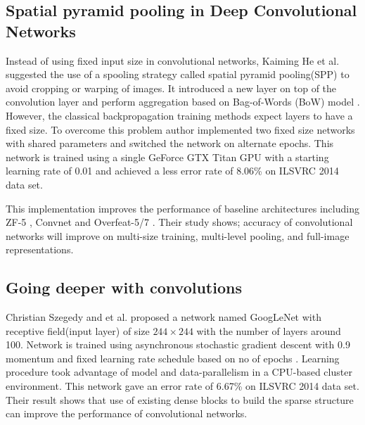 \documentclass{article}
\begin{document}

\subsection{Spatial pyramid pooling in Deep Convolutional Networks}
Instead of using fixed input size in convolutional networks, Kaiming He et al. \cite{He2014} suggested  the use of a spooling strategy called  spatial pyramid pooling(SPP)\cite{Grauman2005}\cite{1641019} to avoid cropping or warping of  images. It introduced a new layer on top of the convolution layer and perform aggregation  based on Bag-of-Words (BoW) model \cite{Sivic2003}. However, the classical backpropagation training methods expect layers to have a fixed   size. To overcome this problem author implemented two fixed size networks with shared parameters and switched the network on alternate epochs. This network is trained using a single GeForce GTX Titan GPU with a starting  learning rate of 0.01 and achieved  a less  error rate of 8.06\% on  ILSVRC 2014 data set. 
\par 
This implementation improves the performance of baseline architectures including ZF-5\cite{Zeiler2013} , Convnet \cite{Krizhevsky2012a} and Overfeat-5/7 \cite{Sermanet2013}. Their study shows; accuracy of convolutional networks will improve on multi-size training, multi-level pooling, and full-image representations. 
%




\subsection{Going deeper with convolutions }
Christian Szegedy and et al. \cite{Szegedy} proposed a network named GoogLeNet with receptive field(input layer) of size $244\times244$ with the number of layers around 100. Network is trained using asynchronous stochastic gradient descent with 0.9 momentum and fixed learning rate schedule based on  no of epochs 
. Learning procedure took advantage of  model and data-parallelism in a CPU-based cluster environment. This network gave an error rate of  6.67\%  on  ILSVRC 2014 data set. Their result shows that use of existing dense  blocks to  build the sparse structure can improve the  performance of convolutional networks.
\end{document}
